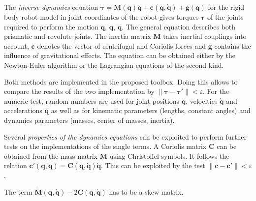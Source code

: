 \documentclass[runningheads]{llncs}
\begin{document}

\begin{property}\label{prop:ser_dyn_tau}
The \emph{inverse dynamics} equation
$\bm{\tau} {=} \bm{M}(\bm{q})\ddot{\bm{q}}{+}\bm{c}(\bm{q},\dot{\bm{q}}){+}\bm{g}(\bm{q})$
for the rigid body robot model in joint coordinates of the robot gives torques $\bm{\tau}$ of the joints required to perform the motion $\bm{q}$, $\dot{\bm{q}}$, $\ddot{\bm{q}}$.
The general equation describes both prismatic and revolute joints.
The inertia matrix $\bm{M}$ takes inertial couplings into account, $\bm{c}$ denotes the vector of centrifugal and Coriolis forces and $\bm{g}$ contains the influence of gravitational effects.
The equation can be obtained either by the Newton-Euler algorithm or the Lagrangian equations of the second kind.
\end{property}

\begin{test}\label{test:ser_dyn_tau}
Both methods are implemented in the proposed toolbox.
Doing this allows to compare the results of the two implementation by $\lVert \bm{\tau}{-}\bm{\tau}' \rVert {<} \varepsilon$.
For the numeric test, random numbers are used for joint positions $\bm{q}$, velocities $\dot{\bm{q}}$ and accelerations $\ddot{\bm{q}}$ as well as for kinematic parameters (lengths, constant angles) and dynamics parameters (masses, center of masses, inertia).
\end{test}


\begin{test}\label{test:ser_dyn_cormat}
Several \emph{properties of the dynamics equations} can be exploited to perform further tests on the implementations of the single terms.
A Coriolis matrix $\bm{C}$ can be obtained from the mass matrix $\bm{M}$ using Christoffel symbols.
It follows the relation $\bm{c}'(\bm{q},\dot{\bm{q}}){=}\bm{C}(\bm{q},\dot{\bm{q}})\dot{\bm{q}}$.
This can be exploited by the test $\lVert \bm{c}{-}\bm{c}' \rVert {<} \varepsilon$.
\end{test}

\begin{test}\label{test:ser_dyn_inertiaD}
The term $\dot{\bm{M}}(\bm{q},\dot{\bm{q}}){-}2\bm{C}(\bm{q},\dot{\bm{q}})$ has to be a skew matrix.
\end{test}
\end{document}
